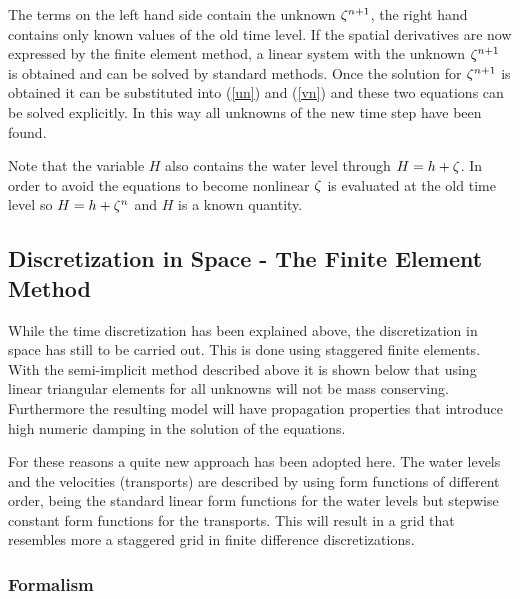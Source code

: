The terms on the left hand side contain the unknown $\mbox{$\zeta^{n+1}$}$, the right hand
contains only known values of the old time level. If the spatial derivatives
are now expressed by the finite element method, a linear system with the unknown
$\mbox{$\zeta^{n+1}$}$ is obtained and can be solved by standard methods. Once the solution
for $\mbox{$\zeta^{n+1}$}$ is obtained it can be substituted into (\ref{un}) and (\ref{vn})
and these two equations can be solved explicitly. In this way all unknowns
of the new time step have been found.

Note that the variable $H$ also contains the water level through
$H=h+\zeta$. In order to avoid the equations to become nonlinear $\zeta$
is evaluated at the old time level so $H=h+\mbox{$\zeta^{n}$}$ and $H$ is a known quantity.




\subsection{Discretization in Space - The Finite Element Method}


While the time discretization has been explained above, the discretization
in space has still to be carried out. This is done 
using staggered finite elements. 
With the semi-implicit method described above
it is shown below that using linear triangular elements
for all unknowns 
will not be mass conserving. Furthermore the resulting model
will have propagation properties that introduce high numeric damping
in the solution of the equations.

For these reasons a quite new approach has been adopted here. The water
levels and the velocities (transports) are described by using form
functions of different order, being the standard linear form functions
for the water levels but stepwise constant form functions for the
transports. This will result in a grid that resembles more a staggered
grid in finite difference discretizations.

\subsubsection{Formalism}


